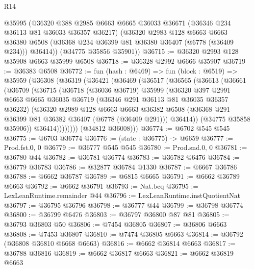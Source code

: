 \begin{lexlean}{R14}
\begin{coremodule}
      @35995
      (@36320
        @388
        @2985
        @6663
        @6665
        @36033
        @36671
        (@36346 @234 @36113 @81 @36033 @36357 @36217)
        (@36320
          @2983
          @128
          @6663
          @6663
          @36380
          @6508
          (@36368 @234 @36399 @81 @36380 @36407 (@6778 (@36409 @234)))
          @36414))
      (@34775 @35856 @35901))
@36715 := @36320 @2993 @128 @35908 @6663 @35999 @6508
@36718 := @36328 @2992 @6666 @35907
@36719 := @36383 @6508
@36772 := fun (hash : @6469) =>
  fun (block : @6519) =>
  @35959
    (@36308
      (@36319
        (@36421
          (@36469
            (@36517
              (@36565
                (@36613
                  (@36661
                    (@36709
                      (@36715
                        (@36718
                          (@36036 @36719)
                          @35999
                          (@36320
                            @397
                            @2991
                            @6663
                            @6665
                            @36035
                            @36719
                            (@36346 @291 @36113 @81 @36035 @36357 @36232)
                            (@36320
                              @2989
                              @128
                              @6663
                              @6663
                              @36382
                              @6508
                              (@36368 @291 @36399 @81 @36382 @36407 (@6778 (@36409 @291)))
                              @36414))
                          (@34775 @35858 @35906))
                        @36414))))))))
        (@34812 @36008)))
@36774 := @6702 @545 @545
@36775 := @6703 @36774
@36776 := (state : @36775) -> @6659
@36777 := Prod.fst.{0, 0}
@36779 := @36777 @545 @545
@36780 := Prod.snd.{0, 0}
@36781 := @36780 @44
@36782 := @36781 @36774
@36783 := @36782 @6476
@36784 := @36779 @36783
@36786 := @32877 @36784 @1330
@36787 := @6667 @36786
@36788 := @6662 @36787
@36789 := @6815 @6665
@36791 := @6662 @36789 @6663
@36792 := @6662 @36791
@36793 := Nat.beq
@36795 := LexLeanRuntime.remainder @44
@36796 := LexLeanRuntime.instQuotientNat
@36797 := @36795 @36796
@36798 := @36777 @44
@36799 := @36798 @36774
@36800 := @36799 @6476
@36803 := @36797 @36800 @87 @81
@36805 := @36793 @36803 @50
@36806 := @7454 @36805
@36807 := @36806 @6663
@36808 := @7453 @36807
@36810 := @7474 @36805 @6663
@36814 := @36792 (@36808 @36810 @6668 @6663)
@36816 := @6662 @36814 @6663
@36817 := @36788 @36816
@36819 := @6662 @36817 @6663
@36821 := @6662 @36819 @6663

\end{coremodule}
\end{lexlean}
